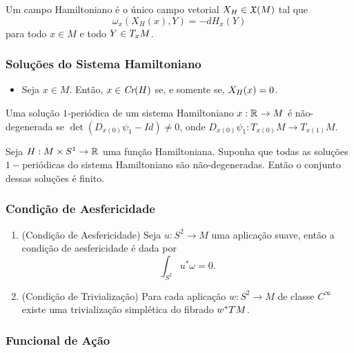 \documentclass{beamer}
\begin{document}
\begin{footnotesize}
\begin{frame}
		\begin{definicao}
			Um campo Hamiltoniano é o único campo vetorial $X_{H}\in \mathfrak{X}(M)$ tal que
			$$
			\omega_{x}(X_{H}(x), Y) = -dH_{x}(Y)
			$$
			para todo $x\in M$ e todo $Y \in T_{x}M$.
		\end{definicao}
		
	\end{frame}

	\begin{frame}
		\frametitle{Soluções do Sistema Hamiltoniano}
		\begin{itemize}
			\item 	Seja $x\in M$. Então, $x\in \textit{Cr}(H)$ se, e somente se, $X_{H}(x)=0$.
		\end{itemize}
		
		\begin{definicao}
			Uma solução $1$-periódica de um sistema Hamiltoniano $x: \mathbb{R}^{}\to M$ é não-degenerada se $\det(D_{x(0)}\psi_{1} - Id)\neq 0$, onde $D_{x(0)}\psi_{1}:T_{x(0)}M \to T_{x(1)}M$.
		\end{definicao}
		
		\begin{proposicao}
			Seja $H:M\times S^{1}\to \mathbb{R}^{}$ uma função Hamiltoniana. Suponha que todas as soluções $1-$periódicas do sistema Hamiltoniano são não-degeneradas. Então o conjunto dessas soluções é finito.
		\end{proposicao}
	\end{frame}

	\begin{frame}
		\frametitle{Condição de Aesfericidade}
			\begin{enumerate}
				
				\item (Condição de Aesfericidade) Seja $u:S^{2} \to M$ uma aplicação suave, então a condição de aesfericidade é dada por 
				$$
				\int_{S^{2}} u^{*}\omega = 0.
				$$
				
				\item (Condição de Trivialização) 
				Para cada aplicação $w:S^{2}\to M$ de classe $C^{\infty}$ existe uma trivialização simplética do fibrado $w^{*}TM$.
				
			\end{enumerate}
	\end{frame}
	
	\begin{frame}
		\frametitle{Funcional de Ação}
		

\end{frame}
\end{footnotesize}
\end{document}
